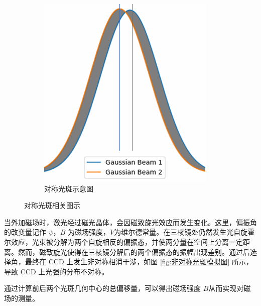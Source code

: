 \documentclass[12pt]{ctexart}
\numberwithin{equation}{section} %
\begin{document}
\begin{figure}[H]
\begin{subfigure}{0.3\textwidth}
        \centering
        \includegraphics[width=\textwidth]{对称光斑示意图.png} %
        \caption{对称光斑示意图} %
        \label{fig:对称光斑示意图} %
    \end{subfigure}
    \caption{对称光斑相关图示} %
    \label{fig:对称光斑总图} %
\end{figure}
当外加磁场时，激光经过磁光晶体，会因磁致旋光效应而发生变化。这里，偏振角的改变量记作 $\psi$，$B$ 为磁场强度，$V$为维尔德常量。在三棱镜处仍然发生光自旋霍尔效应，光束被分解为两个自旋相反的偏振态，并使两分量在空间上分离一定距离。然而，磁致旋光使得在三棱镜分解后的两个偏振态的振幅出现差别。通过后选择角，最终在 CCD 上发生非对称相消干涉，如图 \ref{fig:非对称光斑模拟图} 所示，导致 CCD 上光强的分布不对称。

通过计算前后两个光斑几何中心的总偏移量，可以得出磁场强度 
$B$从而实现对磁场的测量。





\end{document}
